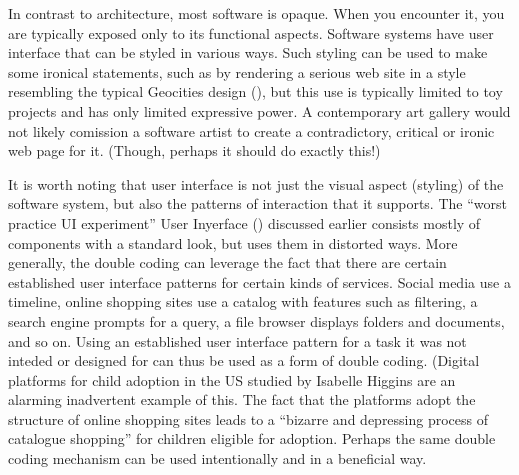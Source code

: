 In contrast to architecture, most software is opaque. When you encounter it, you are typically
exposed only to its functional aspects. Software systems have user interface that can be styled
in various ways. Such styling can be used to make some ironical statements, such as by rendering
a serious web site in a style resembling the typical Geocities design (),
but this use is typically limited to toy projects and has only limited expressive power.
A contemporary art gallery would not likely comission a software artist to create a contradictory,
critical or ironic web page for it. (Though, perhaps it should do exactly this!)

It is worth noting that user interface is not just the visual aspect (styling) of the software
system, but also the patterns of interaction that it supports. The ``worst practice UI experiment''
User Inyerface () discussed earlier consists mostly of components with a
standard look, but uses them in distorted ways. More generally, the double coding can leverage
the fact that there are certain established user interface patterns for certain kinds of services.
Social media use a timeline, online shopping sites use a catalog with features such as filtering,
a search engine prompts for a query, a file browser displays folders and documents, and so on.
Using an established user interface pattern for a task it was not inteded or designed for can
thus be used as a form of double coding. (Digital platforms for child adoption in the US
studied by Isabelle Higgins are an alarming inadvertent example of this. The fact that the
platforms adopt the structure of online shopping sites leads to a ``bizarre and depressing process
of catalogue shopping'' for children eligible for adoption.
Perhaps the same double coding mechanism can be used intentionally and in a beneficial way.

